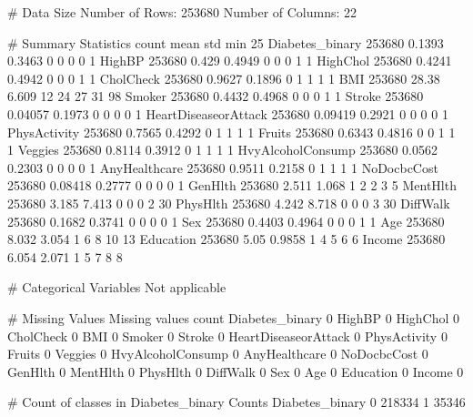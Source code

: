\documentclass[11pt]{article}
\begin{document}
\begin{codeoutput}
# Data Size
Number of Rows: 253680
Number of Columns: 22

# Summary Statistics
                      count    mean    std  min  25%
Diabetes_binary      253680  0.1393 0.3463    0    0    0    0    1
HighBP               253680   0.429 0.4949    0    0    0    1    1
HighChol             253680  0.4241 0.4942    0    0    0    1    1
CholCheck            253680  0.9627 0.1896    0    1    1    1    1
BMI                  253680   28.38  6.609   12   24   27   31   98
Smoker               253680  0.4432 0.4968    0    0    0    1    1
Stroke               253680 0.04057 0.1973    0    0    0    0    1
HeartDiseaseorAttack 253680 0.09419 0.2921    0    0    0    0    1
PhysActivity         253680  0.7565 0.4292    0    1    1    1    1
Fruits               253680  0.6343 0.4816    0    0    1    1    1
Veggies              253680  0.8114 0.3912    0    1    1    1    1
HvyAlcoholConsump    253680  0.0562 0.2303    0    0    0    0    1
AnyHealthcare        253680  0.9511 0.2158    0    1    1    1    1
NoDocbcCost          253680 0.08418 0.2777    0    0    0    0    1
GenHlth              253680   2.511  1.068    1    2    2    3    5
MentHlth             253680   3.185  7.413    0    0    0    2   30
PhysHlth             253680   4.242  8.718    0    0    0    3   30
DiffWalk             253680  0.1682 0.3741    0    0    0    0    1
Sex                  253680  0.4403 0.4964    0    0    0    1    1
Age                  253680   8.032  3.054    1    6    8   10   13
Education            253680    5.05 0.9858    1    4    5    6    6
Income               253680   6.054  2.071    1    5    7    8    8

# Categorical Variables
Not applicable

# Missing Values
                      Missing values count
Diabetes_binary                          0
HighBP                                   0
HighChol                                 0
CholCheck                                0
BMI                                      0
Smoker                                   0
Stroke                                   0
HeartDiseaseorAttack                     0
PhysActivity                             0
Fruits                                   0
Veggies                                  0
HvyAlcoholConsump                        0
AnyHealthcare                            0
NoDocbcCost                              0
GenHlth                                  0
MentHlth                                 0
PhysHlth                                 0
DiffWalk                                 0
Sex                                      0
Age                                      0
Education                                0
Income                                   0

# Count of classes in Diabetes_binary
                 Counts
Diabetes_binary        
0                218334
1                 35346


\end{codeoutput}
\end{document}
